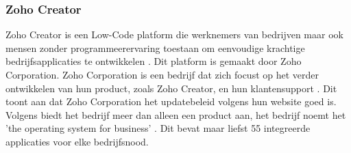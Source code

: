 \subsubsection*{Zoho Creator}
Zoho Creator is een Low-Code platform die werknemers van bedrijven maar ook mensen zonder programmeerervaring toestaan
om eenvoudige krachtige bedrijfsapplicaties te ontwikkelen \autocite{Computer2022}. Dit platform is gemaakt door Zoho Corporation.
Zoho Corporation is een bedrijf dat zich focust op het verder ontwikkelen van hun product, zoals Zoho Creator, en hun klantensupport \autocite{ZohoCorporation2024a}. Dit toont aan dat Zoho Corporation
het updatebeleid volgens hun website goed is. Volgens \textcite{ZohoCorporation2024a} biedt het bedrijf meer dan alleen een product aan, het bedrijf noemt het 'the operating system for business' \autocite{ZohoCorporation2024a}.
Dit bevat maar liefst 55 integreerde applicaties voor elke bedrijfsnood.

